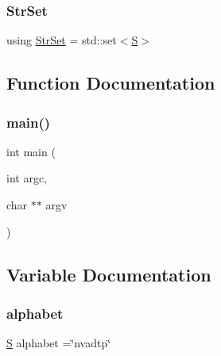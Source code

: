 \subsubsection{\texorpdfstring{Str\+Set}{StrSet}}
{\footnotesize\ttfamily using \hyperlink{_formal_language_theory-_complex_2_main_8cpp_a809d982ed20fa378f251596c3b5ad6b7}{Str\+Set} =  std\+::set$<$\hyperlink{_formal_language_theory-_complex_2_main_8cpp_a51c40915539205f0b5add30b0d68a4cb}{S}$>$}



\subsection{Function Documentation}
\mbox{\label{_formal_language_theory-_complex_2_main_8cpp_a3c04138a5bfe5d72780bb7e82a18e627}} 
\subsubsection{\texorpdfstring{main()}{main()}}
{\footnotesize\ttfamily int main (\begin{DoxyParamCaption}\item[{int}]{argc,  }\item[{char $\ast$$\ast$}]{argv }\end{DoxyParamCaption})}



\subsection{Variable Documentation}
\mbox{\label{_formal_language_theory-_complex_2_main_8cpp_ad762aabf5f551e4c7632fb389b3e2209}} 
\subsubsection{\texorpdfstring{alphabet}{alphabet}}
{\footnotesize\ttfamily \hyperlink{_formal_language_theory-_complex_2_main_8cpp_a51c40915539205f0b5add30b0d68a4cb}{S} alphabet =\char`\"{}nvadtp\char`\"{}}

